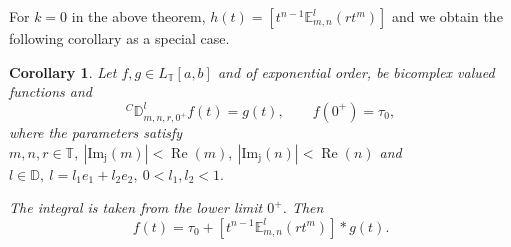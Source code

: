 \documentclass[a4paper,12pt]{article}
\newtheorem{corollary}[theorem] {Corollary}
\theoremstyle{remark}
\begin{document}
 For $k=0$ in the above theorem, $h(t)=[t^{n-1}\mathbb{E}_{ m,n}^l(r t^{ m})]$ and we obtain the following corollary as a special case.   
\begin{corollary}\label{th:cauchy-nonhomocor}
    Let $f,g\in  L_{\mathbb{T}}[a, b] $ and of exponential order, be bicomplex valued functions and
\begin{equation}\label{cauchy}
{}^{C}\mathbb{D}^{l}_{m,n,r,0^+} f(t) = g(t), 
\qquad f(0^+) = \tau_0,
\end{equation}
where the parameters satisfy 
$m,n,r \in \mathbb{T},~|\operatorname{Im_j}(m)|<\operatorname{Re}(m),~|\operatorname{Im_j}(n)|<\operatorname{Re}(n)$ and $l\in \mathbb{D},~l=l_1e_1+l_2e_2, ~0<l_1,l_2<1.$

The integral is taken from the lower limit $0^+$. Then
\begin{equation}
{f}(t) = \tau_0 +[t^{n-1}\mathbb{E}_{ m,n}^l(r t^{ m})]*g(t).
\end{equation}

\end{corollary}	



\end{document}
